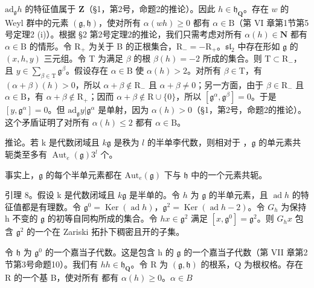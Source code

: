 \(\mathrm{ad}_{\mathfrak{g}}h\) 的特征值属于 \(\mathbf{Z}\)（§1，第2号，命题2的推论）。因此 \(h \in \mathfrak{h}_{\mathbf{Q}}\)。存在 \(w\) 的 Weyl 群中的元素 \((\mathfrak{g}, \mathfrak{h})\)，使对所有 \(\alpha(wh) \geq 0\) 都有 \(\alpha \in \mathrm{B}\)（第 VI 章第1节第5号定理2 (i)）。根据 §2 第2号定理2的推论，我们只需考虑对所有 \(\alpha(h) \in \mathbf{N}\) 都有 \(\alpha \in \mathrm{B}\) 的情形。令 \(\mathrm{R}_{+}\) 为关于 B 的正根集合，\(\mathrm{R}_{-} = -\mathrm{R}_{+}\)。\(\mathfrak{sl}_2\) 中存在形如 \(\mathfrak{g}\) 的 \((x, h, y)\) 三元组。令 T 为满足 \(\beta\) 的根 \(\beta(h) = -2\) 所成的集合。则 \(\mathrm{T} \subset \mathrm{R}_{-}\)，且 \(y \in \sum_{\beta \in \mathrm{T}} \mathfrak{g}^{\beta}\)。假设存在 \(\alpha \in \mathrm{B}\) 使 \(\alpha(h) > 2\)。对所有 \(\beta \in \mathrm{T}\)，有 \((\alpha + \beta)(h) > 0\)，所以 \(\alpha + \beta \notin \mathrm{R}_{-}\) 且 \(\alpha + \beta \neq 0\)；另一方面，由于 \(\beta \in \mathrm{R}_{-}\) 且 \(\alpha \in \mathrm{B}\)，有 \(\alpha + \beta \notin \mathrm{R}_{+}\)；因而 \(\alpha + \beta \notin \mathrm{R} \cup \{0\}\)，所以 \([\mathfrak{g}^{\alpha}, \mathfrak{g}^{\beta}] = 0\)。于是 \([y, \mathfrak{g}^{\alpha}] = 0\)。但 \(\mathrm{ad}_{\mathfrak{g}}y|\mathfrak{g}^{\alpha}\) 是单射，因为 \(\alpha(h) > 0\)（§1，第2号，命题2的推论）。这个矛盾证明了对所有 \(\alpha(h) \leq 2\) 都有 \(\alpha \in \mathrm{B}\)。

推论。若 k 是代数闭域且 \(k\)\(\mathfrak{g}\) 是秩为 \(l\) 的半单李代数，则相对于 ，\(\mathfrak{g}\) 的单元素共轭类至多有 \(\operatorname{Aut}_e(\mathfrak{g})\)\(3^l\) 个。

事实上，\(\mathfrak{g}\) 的每个半单元素都在 \(\mathrm{Aut}_e(\mathfrak{g})\) 下与 \(\mathfrak{h}\) 中的一个元素共轭。

引理 8。假设 k 是代数闭域且 \(k\)\(\mathfrak{g}\) 是半单的。令 \(h\) 为 \(\mathfrak{g}\) 的半单元素，且 \(\operatorname{ad} h\) 的特征值都是有理数。令 \(\mathfrak{g}^0 = \operatorname{Ker}(\operatorname{ad} h)\)，\(\mathfrak{g}^2 = \operatorname{Ker}(\operatorname{ad} h - 2)\)。令 \(G_h\) 为保持 h 不变的 \(\mathfrak{g}\) 的初等自同构所成的集合。令 \(h\)\(x \in \mathfrak{g}^2\) 满足 \([x, \mathfrak{g}^0] = \mathfrak{g}^2\)。则 \(G_h x\) 包含 \(\mathfrak{g}^2\) 的一个在 Zariski 拓扑下稠密且开的子集。

令 \(\mathfrak{h}\) 为 \(\mathfrak{g}^0\) 的一个嘉当子代数。这是包含 h 的 \(\mathfrak{g}\) 的一个嘉当子代数（第 VII 章第2节第3号命题10）。我们有 \(h\)\(h \in \mathfrak{h}_{\mathbf{Q}}\)。令 R 为 \((\mathfrak{g}, \mathfrak{h})\) 的根系，Q 为根权格。存在 R 的一个基 B，使对所有  都有 \(\alpha(h) \geq 0\)。\(\alpha \in B\)

